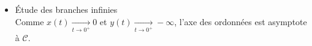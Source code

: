 {\begin{enumerate}
{\begin{itemize}
$$\begin{array}{c|lcccr}
\ & & &-1/e &\ & \\\hline
\ & &\ & & &0 \\
&\ & &\ &\nearrow& \\
&\ & &-e & & \\
y&\ &\nearrow &\ &\ & \\
\ &-\infty & & &\ & \\\hline
y'(t)&+\infty & + &2e^2 & +&1 \\
\end{array}$$
Il n'y a pas de point singulier.
\item \'Etude des branches infinies\\
Comme $x(t)\xrightarrow[t\to 0^+]{}0$ et $y(t)\xrightarrow[t\to 0^+]{}-\infty$, l'axe des ordonnées est asymptote à $\mathcal{C}$.
\end{itemize}
}
\end{enumerate}
}
